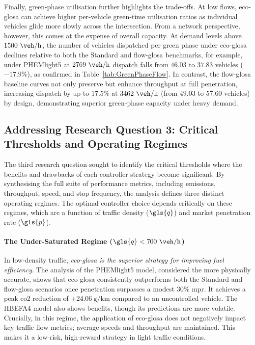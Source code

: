 Finally, green‐phase utilisation further highlights the trade‐offs. At low flows, \ac{eco-glosa} can achieve higher per‐vehicle green‐time utilisation ratios as individual vehicles glide more slowly across the intersection. From a network perspective, however, this comes at the expense of overall capacity. At demand levels above $1500~\unit{\veh\per\hour}$, the number of vehicles dispatched per green phase under \ac{eco-glosa} declines relative to both the Standard and \ac{flow-glosa} benchmarks, for example, under PHEMlight5 at $2769~\unit{\veh\per\hour}$ dispatch falls from $46.03$ to $37.83$ vehicles ($-17.9\%$), as confirmed in Table~\vref{tab:GreenPhaseFlow}. In contrast, the \ac{flow-glosa} baseline curves not only preserve but enhance throughput at full penetration, increasing dispatch by up to $17.5\%$ at $3462~\unit{\veh\per\hour}$ (from $49.03$ to $57.60$ vehicles) by design, demonstrating superior green‐phase capacity under heavy demand.

\subsection*{Addressing Research Question 3: Critical Thresholds and Operating Regimes}
The third research question sought to identify the critical thresholds where the benefits and drawbacks of each controller strategy become significant. By synthesising the full suite of performance metrics, including emissions, throughput, speed, and stop frequency, the analysis defines three distinct operating regimes. The optimal controller choice depends critically on these regimes, which are a function of traffic density ($\gls{q}$) and market penetration rate ($\gls{p}$).

\paragraph{The Under-Saturated Regime ($\gls{q} < 700~\unit{\veh\per\hour}$)}
In low-density traffic, \textit{\ac{eco-glosa} is the superior strategy for improving fuel efficiency}. The analysis of the PHEMlight5 model, considered the more physically accurate, shows that \ac{eco-glosa} consistently outperforms both the Standard and \ac{flow-glosa} scenarios once penetration surpasses a modest $30\%$ \ac{mpr}. It achieves a peak \ac{co2} reduction of $+24.06~\unit{\gram\per\kilo\metre}$ compared to an uncontrolled vehicle. The HBEFA4 model also shows benefits, though its predictions are more volatile. Crucially, in this regime, the application of \ac{eco-glosa} does not negatively impact key traffic flow metrics; average speeds and throughput are maintained. This makes it a low-risk, high-reward strategy in light traffic conditions.

